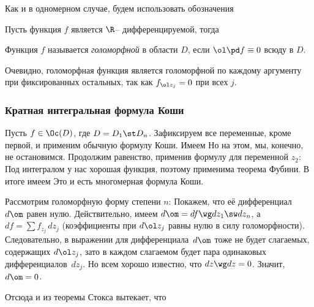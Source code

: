 \documentclass[a4paper]{article}
\begin{document}
Как и в одномерном случае, будем использовать обозначения

Пусть функция $f$ является $\R$-- дифференцируемой, тогда

\begin{df}
Функция $f$ называется \emph{голоморфной} в области $D$, если $\ol \pd f \equiv 0$ всюду в $D$.
\end{df}

Очевидно, голоморфная функция является голоморфной по каждому аргументу при фиксированных
остальных, так как $f_{\ol z_j}=0$ при всех $j$.

\subsubsection{Кратная интегральная формула Коши}

Пусть $f\in \Oc(D)$, где $D = D_1 \st D_n$. Зафиксируем все переменные, кроме первой,
и применим обычную формулу Коши. Имеем
Но на этом, мы, конечно, не остановимся. Продолжим равенство, применив формулу для переменной $z_2$:
Под интегралом у нас хорошая функция, поэтому применима теорема Фубини. В итоге имеем
Это и есть многомерная формула Коши.

\medskip

Рассмотрим голоморфную форму степени $n$:
Покажем, что её дифференциал $d\om$ равен нулю. Действительно, имеем
$d\om = df\wg dz_1\sw dz_n$, а $df = \sum f_{z_j}\,dz_j$ (коэффициенты при $d\ol z_j$
равны нулю в силу голоморфности). Следовательно, в выражении для дифференциала~$d\om$
тоже не будет слагаемых, содержащих $d\ol z_j$, зато в каждом слагаемом будет пара
одинаковых дифференциалов~$dz_j$. Но всем хорошо известно, что $dz\wg dz =0$. Значит, $d\om=0$.

Отсюда и из теоремы Стокса вытекает, что
\end{document}
